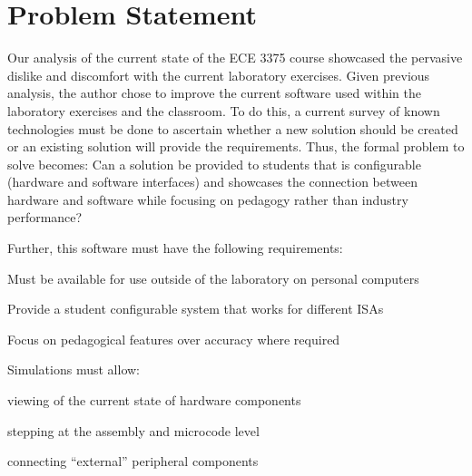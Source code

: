 \section{Problem Statement}

Our analysis of the current state of the ECE 3375 course showcased the pervasive dislike and discomfort with the current laboratory exercises. Given previous analysis, the author chose to improve the current software used within the laboratory exercises and the classroom. To do this, a current survey of known technologies must be done to ascertain whether a new solution should be created or an existing solution will provide the requirements. Thus, the formal problem to solve becomes: Can a solution be provided to students that is configurable (hardware and software interfaces) and showcases the connection between hardware and software while focusing on pedagogy rather than industry performance? 

Further, this software must have the following requirements: 

\begin{requirements}
    \item\label{req:personal} Must be available for use outside of the laboratory on personal computers
        
    \item\label{req:configuration} Provide a student configurable system that works for different ISAs
        
    \item\label{req:pedagogical} Focus on pedagogical features over accuracy where required
        
    \item\label{req:simulations} Simulations must allow: 
        \begin{requirements}
            \item viewing of the current state of hardware components
            \item stepping at the assembly and microcode level
            \item connecting ``external'' peripheral components
        \end{requirements}
        
\end{requirements}


